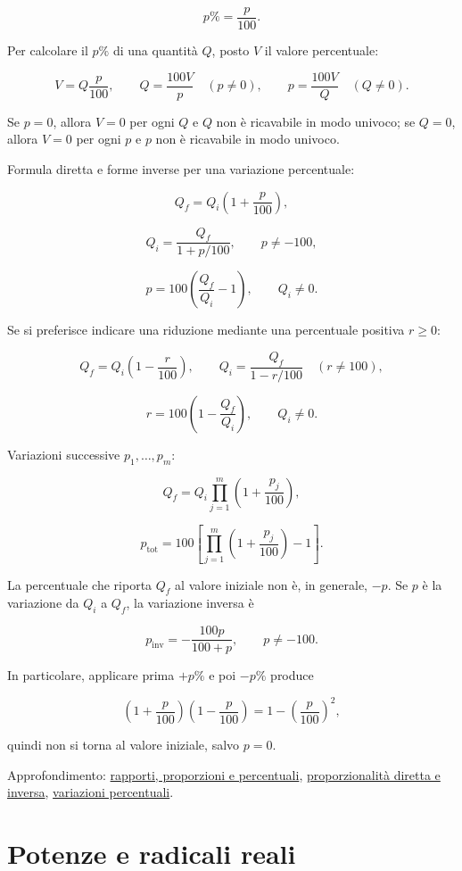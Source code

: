 \[
p\%=\frac p{100}.
\]

Per calcolare il \(p\%\) di una quantità \(Q\), posto \(V\) il valore percentuale:

\[
V=Q\frac p{100},
\qquad
Q=\frac{100V}{p}\quad(p\ne0),
\qquad
p=\frac{100V}{Q}\quad(Q\ne0).
\]

Se \(p=0\), allora \(V=0\) per ogni \(Q\) e \(Q\) non è ricavabile in modo univoco; se \(Q=0\), allora \(V=0\) per ogni \(p\) e \(p\) non è ricavabile in modo univoco.

Formula diretta e forme inverse per una variazione percentuale:

\[
Q_f=Q_i\left(1+\frac p{100}\right),
\]

\[
Q_i=\frac{Q_f}{1+p/100},
\qquad p\ne-100,
\]

\[
p=100\left(\frac{Q_f}{Q_i}-1\right),
\qquad Q_i\ne0.
\]

Se si preferisce indicare una riduzione mediante una percentuale positiva \(r\ge0\):

\[
Q_f=Q_i\left(1-\frac r{100}\right),
\qquad
Q_i=\frac{Q_f}{1-r/100}\quad(r\ne100),
\]

\[
r=100\left(1-\frac{Q_f}{Q_i}\right),
\qquad Q_i\ne0.
\]

Variazioni successive \(p_1,\ldots,p_m\):

\[
Q_f=Q_i\prod_{j=1}^m\left(1+\frac{p_j}{100}\right),
\]

\[
p_{\mathrm{tot}}
=100\left[
\prod_{j=1}^m\left(1+\frac{p_j}{100}\right)-1
\right].
\]

La percentuale che riporta \(Q_f\) al valore iniziale non è, in generale, \(-p\). Se \(p\) è la variazione da \(Q_i\) a \(Q_f\), la variazione inversa è

\[
p_{\mathrm{inv}}=-\frac{100p}{100+p},
\qquad p\ne-100.
\]

In particolare, applicare prima \(+p\%\) e poi \(-p\%\) produce

\[
\left(1+\frac p{100}\right)\left(1-\frac p{100}\right)
=1-\left(\frac p{100}\right)^2,
\]

quindi non si torna al valore iniziale, salvo \(p=0\).

Approfondimento: \href{https://ingegnerismo.it/matematica/rapporti-proporzioni-percentuali/}{rapporti, proporzioni e percentuali}, \href{https://ingegnerismo.it/matematica/proporzionalita-diretta-e-inversa/}{proporzionalità diretta e inversa}, \href{https://ingegnerismo.it/matematica/variazioni-percentuali/}{variazioni percentuali}.

\section{Potenze e radicali reali}\label{potenze-e-radicali-reali}

